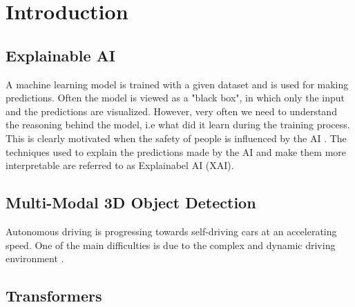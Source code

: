 \chapter{Introduction}

\section{Explainable AI}
A machine learning model is trained with a given dataset and is used for making predictions.
Often the model is viewed as a "black box", in which only the input and the predictions are visualized. 
However, very often we need to understand the reasoning behind the model, i.e what did it learn during the training process.
This is clearly motivated when the safety of people is influenced by the AI \cite{abeloos2022explaining}.
The techniques used to explain the predictions made by the AI and make them more interpretable are referred to as Explainabel AI (XAI).


\section{Multi-Modal 3D Object Detection}
Autonomous driving is progressing towards self-driving cars at an accelerating speed. One of the main difficulties is due to
the complex and dynamic driving environment \cite{wang2021multi}. 
\section{Transformers}
